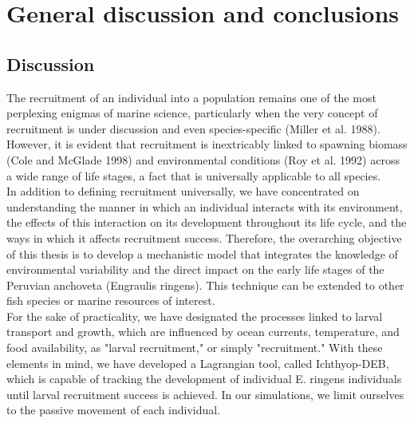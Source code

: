 \chapter{General discussion and conclusions}\label{Chap6}

\clearpage

\section{Discussion}

The recruitment of an individual into a population remains one of the most perplexing enigmas of marine science, particularly when the very concept of recruitment is under discussion and even species-specific (Miller et al. 1988). However, it is evident that recruitment is inextricably linked to spawning biomass (Cole and McGlade 1998) and environmental conditions (Roy et al. 1992) across a wide range of life stages, a fact that is universally applicable to all species.\\

In addition to defining recruitment universally, we have concentrated on understanding the manner in which an individual interacts with its environment, the effects of this interaction on its development throughout its life cycle, and the ways in which it affects recruitment success. Therefore, the overarching objective of this thesis is to develop a mechanistic model that integrates the knowledge of environmental variability and the direct impact on the early life stages of the Peruvian anchoveta (Engraulis ringens). This technique can be extended to other fish species or marine resources of interest.\\

For the sake of practicality, we have designated the processes linked to larval transport and growth, which are influenced by ocean currents, temperature, and food availability, as "larval recruitment," or simply "recruitment." With these elements in mind, we have developed a Lagrangian tool, called Ichthyop-DEB, which is capable of tracking the development of individual E. ringens individuals until larval recruitment success is achieved. In our simulations, we limit ourselves to the passive movement of each individual.\\

